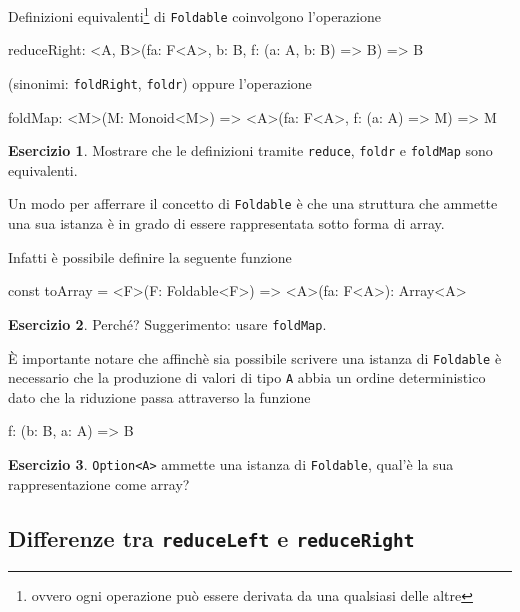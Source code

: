 \documentclass[12pt]{article}
\theoremstyle{definition}
\newtheorem{exercise}{Esercizio}[section]
\newenvironment{code}
  {\vspace{0.5cm} \VerbatimEnvironment\begin{typescriptcode}}
  {\end{typescriptcode} \vspace{0.2cm}}
\begin{document}
Definizioni equivalenti\footnote{ovvero ogni operazione può essere derivata da una qualsiasi delle altre} di \texttt{Foldable}
coinvolgono l'operazione

\begin{code}
reduceRight: <A, B>(fa: F<A>, b: B, f: (a: A, b: B) => B) => B
\end{code}

(sinonimi: \texttt{foldRight}, \texttt{foldr}) oppure l'operazione

\begin{code}
foldMap: <M>(M: Monoid<M>) =>
  <A>(fa: F<A>, f: (a: A) => M) => M
\end{code}

\begin{exercise}
Mostrare che le definizioni tramite \texttt{reduce}, \texttt{foldr} e \texttt{foldMap} sono equivalenti.
\end{exercise}

Un modo per afferrare il concetto di \texttt{Foldable} è che una struttura che ammette una sua istanza
è in grado di essere rappresentata sotto forma di array.

Infatti è possibile definire la seguente funzione

\begin{code}
const toArray = <F>(F: Foldable<F>) => <A>(fa: F<A>): Array<A>
\end{code}

\begin{exercise}
Perché? Suggerimento: usare \texttt{foldMap}.
\end{exercise}

È importante notare che affinchè sia possibile scrivere una istanza di \texttt{Foldable} è necessario che la produzione di valori
di tipo \texttt{A} abbia un ordine deterministico dato che la riduzione passa attraverso la funzione

\begin{code}
f: (b: B, a: A) => B
\end{code}

\begin{exercise}
\texttt{Option<A>} ammette una istanza di \texttt{Foldable}, qual'è la sua rappresentazione come array?
\end{exercise}

\subsection{Differenze tra \texttt{reduceLeft} e \texttt{reduceRight}}
\end{document}
